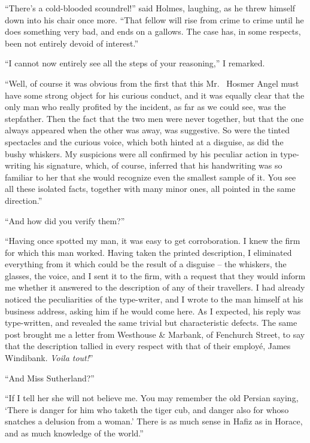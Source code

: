 “There’s a cold-blooded scoundrel!” said Holmes, laughing,
as he threw himself down into his chair once more. “That
fellow will rise from crime to crime until he does something
very bad, and ends on a gallows. The case has, in some respects,
been not entirely devoid of interest.”

“I cannot now entirely see all the steps of your reasoning,”
I remarked.

“Well, of course it was obvious from the first that this Mr.\ %
Hosmer Angel must have some strong object for his curious
conduct, and it was equally clear that the only man who really
profited by the incident, as far as we could see, was the
stepfather. Then the fact that the two men were never together,
but that the one always appeared when the other was away,
was suggestive. So were the tinted spectacles and the curious
voice, which both hinted at a disguise, as did the bushy
whiskers. My suspicions were all confirmed by his peculiar
action in type-writing his signature, which, of course, inferred
that his handwriting was so familiar to her that she would
recognize even the smallest sample of it. You see all these
isolated facts, together with many minor ones, all pointed in
the same direction.”

“And how did you verify them?”

“Having once spotted my man, it was easy to get corroboration.
I knew the firm for which this man worked. Having
taken the printed description, I eliminated everything from it
which could be the result of a disguise -- the whiskers, the
glasses, the voice, and I sent it to the firm, with a request that
they would inform me whether it answered to the description
of any of their travellers. I had already noticed the peculiarities
of the type-writer, and I wrote to the man himself at his
business address, asking him if he would come here. As I
expected, his reply was type-written, and revealed the same
trivial but characteristic defects. The same post brought me
a letter from Westhouse \& Marbank, of Fenchurch Street, to
say that the description tallied in every respect with that of
their employé, James Windibank. \textit{Voila tout!}”

“And Miss Sutherland?”

“If I tell her she will not believe me. You may remember
the old Persian saying, ‘There is danger for him who taketh
the tiger cub, and danger also for whoso snatches a delusion
from a woman.’ There is as much sense in Hafiz as in Horace,
and as much knowledge of the world.”

